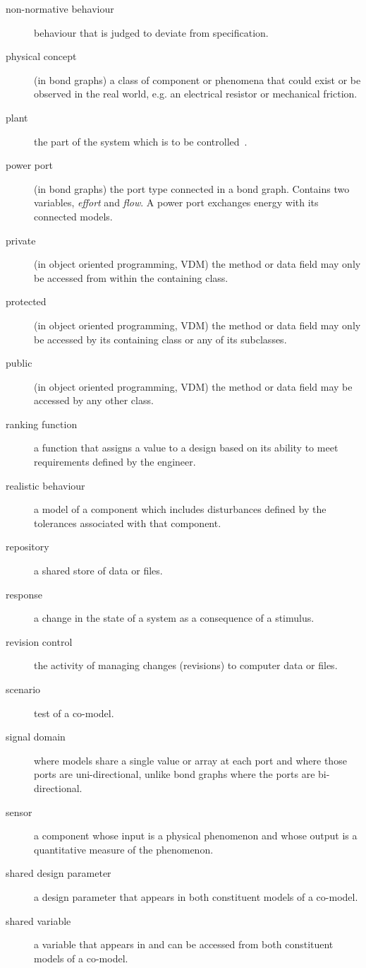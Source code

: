 \documentclass{crescendorepchap}
\begin{document}
\begin{description}
\item[non-normative behaviour] behaviour that is judged to deviate from specification.
\item[physical concept] (in bond graphs) a class of component or phenomena that could exist or be observed in the real world, e.g. an electrical resistor or mechanical friction.
\item[plant] the part of the system which is to be controlled~\cite{IEEE100}.
\item[power port] (in bond graphs) the port type connected in a bond graph.  Contains two variables, \textit{effort} and \textit{flow}.  A power port exchanges energy with its connected models.
\item[private] (in object oriented programming, VDM) the method or data field may only be accessed from within the containing class.
\item[protected](in object oriented programming, VDM) the method or data field may only be accessed by its containing class or any of its subclasses.
\item[public] (in object oriented programming, VDM) the method or data field may be accessed by any other class.
\item[ranking function] a function that assigns a value to a design based on its ability to meet requirements defined by the engineer.
\item[realistic behaviour] a model of a component which includes disturbances defined by the tolerances associated with that component.
\item[repository] a shared store of data or files.
\item[response] a change in the state of a system as a consequence of a stimulus.
\item[revision control] the activity of managing changes (revisions) to computer data or files.
\item[scenario] test of a co-model.
\item[signal domain] where models share a single value or array at each port and where those ports are uni-directional, unlike bond graphs where the ports are bi-directional.
\item[sensor] a component whose input is a physical phenomenon and whose output is a quantitative measure of the phenomenon.
\item[shared design parameter] a design parameter that appears in both constituent models of a co-model.
\item[shared variable] a variable that appears in and can be accessed from both constituent models of a co-model.

\end{description}
\end{document}

